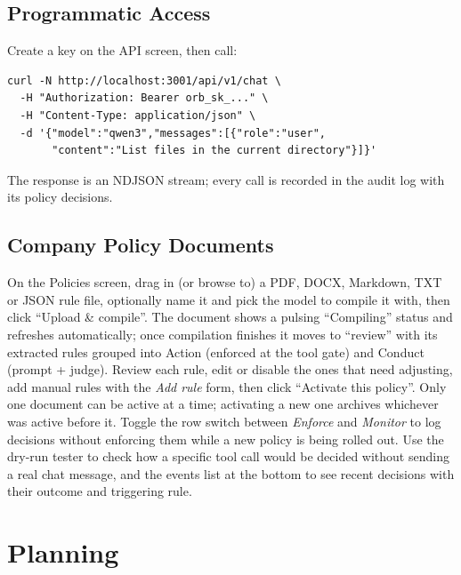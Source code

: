 \documentclass[12pt,a4paper,oneside]{report}
\begin{document}
\section{Programmatic Access}
Create a key on the API screen, then call:
\begin{singlespace}
\small
\begin{verbatim}
curl -N http://localhost:3001/api/v1/chat \
  -H "Authorization: Bearer orb_sk_..." \
  -H "Content-Type: application/json" \
  -d '{"model":"qwen3","messages":[{"role":"user",
       "content":"List files in the current directory"}]}'
\end{verbatim}
\end{singlespace}
The response is an NDJSON stream; every call is recorded in the audit
log with its policy decisions.

\section{Company Policy Documents}
On the Policies screen, drag in (or browse to) a PDF, DOCX, Markdown,
TXT or JSON rule file, optionally name it and pick the model to
compile it with, then click ``Upload \& compile''. The document shows
a pulsing ``Compiling'' status and refreshes automatically; once
compilation finishes it moves to ``review'' with its extracted rules
grouped into Action (enforced at the tool gate) and Conduct (prompt +
judge). Review each rule, edit or disable the ones that need
adjusting, add manual rules with the \emph{Add rule} form, then click
``Activate this policy''. Only one document can be active at a time;
activating a new one archives whichever was active before it. Toggle
the row switch between \emph{Enforce} and \emph{Monitor} to log
decisions without enforcing them while a new policy is being rolled
out. Use the dry-run tester to check how a specific tool call would be
decided without sending a real chat message, and the events list at
the bottom to see recent decisions with their outcome and triggering
rule.

\chapter{Planning}
\end{document}
